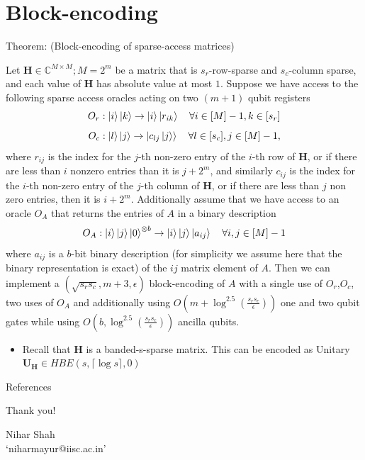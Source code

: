 \documentclass[serif, aspectratio=169]{beamer}
\begin{document}
\section{Block-encoding}
\begin{frame}
\small %
\begin{block}{Theorem: (Block-encoding of sparse-access matrices) ~\cite{Gily_n_2019}}
\end{block}
Let $\mathbf{H} \in \mathbb{C}^{M\times M}; M=2^m$ be a matrix that is $s_r$-row-sparse and $s_c$-column sparse, and each value of $\mathbf{H}$ has absolute value at most $1$. Suppose we have access to the following sparse access oracles acting on two $(m+1)$ qubit registers
\[
O_r:\ket{i}\ket{k}\rightarrow \ket{i}\ket{r_{ik}} \quad \forall i \in [M]-1,k\in[s_r] 
\]
\[
O_c:\ket{l}\ket{j}\rightarrow \ket{c_{lj}\ket{j}}\quad \forall l\in [s_c],j\in[M]-1,
\]
where $r_{ij}$ is the index for the $j$-th non-zero entry of the $i$-th row of $\mathbf{H}$,  or if there are less than $i$ nonzero entries than it is $j+2^m$, and similarly $c_{ij}$ is the index for the $i$-th non-zero entry  of the $j$-th column of $\mathbf{H}$, or if there are less than $j$ non zero entries, then it is $i+2^m$. Additionally assume that we have access to an oracle $O_A$ that returns the entries of $A$ in a binary description
    \[
    O_A:\ket{i}\ket{j}\ket{0}^{\otimes b}\rightarrow \ket{i}\ket{j}\ket{a_{ij}}\quad \forall i,j\in[M]-1
    \]
    where $a_{ij}$ is a $b$-bit binary description (for simplicity we assume here that the binary representation is exact) of the $ij$ matrix element of $A$. Then we can implement a $(\sqrt{s_rs_c},m+3,\epsilon)$ block-encoding of $A$ with a single use of $O_r$,$O_c$, two uses of $O_A$ and additionally using $O(m+\log^{2.5}\left(\frac{s_rs_c}{\epsilon}\right))$ one and two qubit gates while using $O(b,\log^{2.5}\left(\frac{s_rs_c}{\epsilon}\right))$ ancilla qubits.
\end{frame}

\begin{frame}
    \begin{itemize}
    \item Recall that $\mathbf{H}$ is a banded-s-sparse matrix. This can be encoded as Unitary $\mathbf{U_H}\in HBE(s,\lceil\log s\rceil,0)$
\end{itemize}
\end{frame}

\begin{frame}{References}
    \printbibliography
\end{frame}


\begin{frame}
\begin{center}
{ Thank you!}
\vspace{1cm}

Nihar Shah\\[1em]
`niharmayur@iisc.ac.in'
\end{center}
\end{frame}
\end{document}
